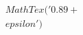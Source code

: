 \documentclass[preview]{standalone}
\begin{document}
\begin{align*}
MathTex('0.89 + \\epsilon')
\end{align*}
\end{document}
